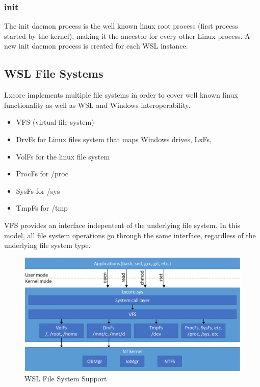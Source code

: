             \subsubsection{init}
            The init daemon process is the well known linux root process (first process started by the kernel), making it the ancestor for
            every other Linux process. A new init daemon process is created for each WSL instance.


        \subsection{WSL File Systems}
            Lxcore implements multiple file systems in order to cover well known linux functionality as well as WSL and Windows interoperability.


            \begin{itemize}
                \item VFS (virtual file system)
                \item DrvFs for Linux files system that maps Windows drives, LxFs, 
                \item VolFs for the linux file system
                \item ProcFs for /proc
                \item SysFs for /sys
                \item TmpFs for /tmp
            \end{itemize}

            VFS provides an interface indepentent of the underlying file system. In this model, all file system operations go through the
            same interface, regardless of the underlying file system type\cite{TheArtOfMemoryForensics}.

            \begin{figure}[H]
                \includegraphics[width=\linewidth]{img/wsl_file_system.png}
                \caption{WSL File System Support \protect\cite{WSLFS}}
                \label{fig:wsl_file_system}
            \end{figure}

